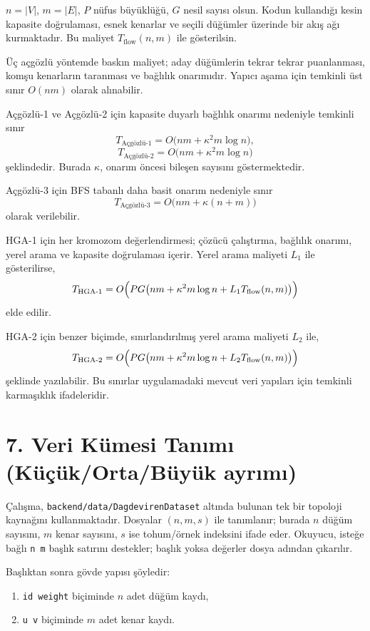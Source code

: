 \documentclass[11pt]{article}
\begin{document}
\(n=|V|\), \(m=|E|\), \(P\) nüfus büyüklüğü, \(G\) nesil sayısı olsun. Kodun kullandığı kesin kapasite doğrulaması, esnek kenarlar ve seçili düğümler üzerinde bir akış ağı kurmaktadır. Bu maliyet \(T_{\mathrm{flow}}(n,m)\) ile gösterilsin.

Üç açgözlü yöntemde baskın maliyet; aday düğümlerin tekrar tekrar puanlanması, komşu kenarların taranması ve bağlılık onarımıdır. Yapıcı aşama için temkinli üst sınır \(O(nm)\) olarak alınabilir.

Açgözlü-1 ve Açgözlü-2 için kapasite duyarlı bağlılık onarımı nedeniyle temkinli sınır
\[
T_{\text{Açgözlü-1}}=O\bigl(nm+\kappa^2m\log n\bigr),
\]
\[
T_{\text{Açgözlü-2}}=O\bigl(nm+\kappa^2m\log n\bigr)
\]
şeklindedir. Burada \(\kappa\), onarım öncesi bileşen sayısını göstermektedir.

Açgözlü-3 için BFS tabanlı daha basit onarım nedeniyle sınır
\[
T_{\text{Açgözlü-3}}=O\bigl(nm+\kappa(n+m)\bigr)
\]
olarak verilebilir.

HGA-1 için her kromozom değerlendirmesi; çözücü çalıştırma, bağlılık onarımı, yerel arama ve kapasite doğrulaması içerir. Yerel arama maliyeti \(L_1\) ile gösterilirse,
\[
T_{\text{HGA-1}}=O\Bigl(PG\bigl(nm+\kappa^2m\log n+L_1T_{\mathrm{flow}}(n,m)\bigr)\Bigr)
\]
elde edilir.

HGA-2 için benzer biçimde, sınırlandırılmış yerel arama maliyeti \(L_2\) ile,
\[
T_{\text{HGA-2}}=O\Bigl(PG\bigl(nm+\kappa^2m\log n+L_2T_{\mathrm{flow}}(n,m)\bigr)\Bigr)
\]
şeklinde yazılabilir. Bu sınırlar uygulamadaki mevcut veri yapıları için temkinli karmaşıklık ifadeleridir.

\section*{7. Veri Kümesi Tanımı (Küçük/Orta/Büyük ayrımı)}

Çalışma, \texttt{backend/data/DagdevirenDataset} altında bulunan tek bir topoloji kaynağını kullanmaktadır. Dosyalar \((n,m,s)\) ile tanımlanır; burada \(n\) düğüm sayısını, \(m\) kenar sayısını, \(s\) ise tohum/örnek indeksini ifade eder. Okuyucu, isteğe bağlı \texttt{n m} başlık satırını destekler; başlık yoksa değerler dosya adından çıkarılır.

Başlıktan sonra gövde yapısı şöyledir:
\begin{enumerate}
    \item \texttt{id weight} biçiminde \(n\) adet düğüm kaydı,
    \item \texttt{u v} biçiminde \(m\) adet kenar kaydı.
\end{enumerate}
\end{document}
